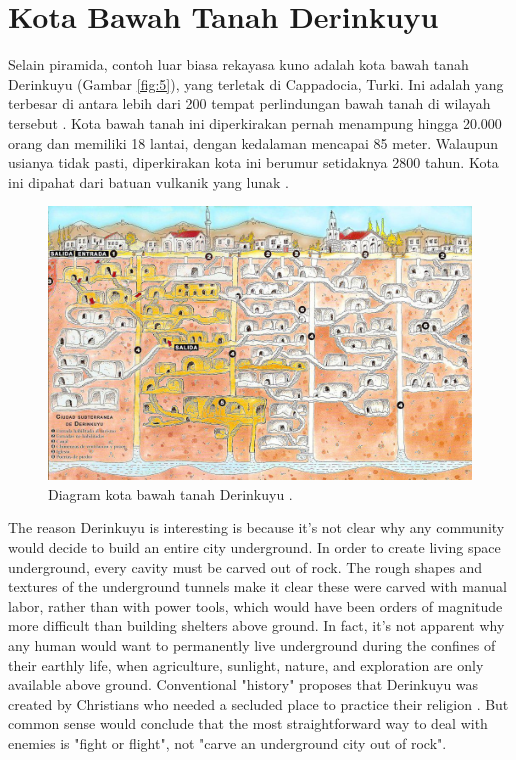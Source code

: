 \documentclass[10pt,twocolumn,letterpaper]{article}
\begin{document}
\section{Kota Bawah Tanah Derinkuyu}

Selain piramida, contoh luar biasa rekayasa kuno adalah kota bawah tanah Derinkuyu (Gambar \ref{fig:5}), yang terletak di Cappadocia, Turki. Ini adalah yang terbesar di antara lebih dari 200 tempat perlindungan bawah tanah di wilayah tersebut \cite{54}. Kota bawah tanah ini diperkirakan pernah menampung hingga 20.000 orang dan memiliki 18 lantai, dengan kedalaman mencapai 85 meter. Walaupun usianya tidak pasti, diperkirakan kota ini berumur setidaknya 2800 tahun. Kota ini dipahat dari batuan vulkanik yang lunak \cite{52, 53}.

\begin{figure}[b]
\begin{center}
   \includegraphics[width=1\linewidth]{derinkuyu.jpeg}
\end{center}
   \caption{Diagram kota bawah tanah Derinkuyu \cite{56}.}
\label{fig:5}
\label{fig:onecol}
\end{figure}
The reason Derinkuyu is interesting is because it's not clear why any community would decide to build an entire city underground. In order to create living space underground, every cavity must be carved out of rock. The rough shapes and textures of the underground tunnels make it clear these were carved with manual labor, rather than with power tools, which would have been orders of magnitude more difficult than building shelters above ground. In fact, it's not apparent why any human would want to permanently live underground during the confines of their earthly life, when agriculture, sunlight, nature, and exploration are only available above ground. Conventional "history" proposes that Derinkuyu was created by Christians who needed a secluded place to practice their religion \cite{53}. But common sense would conclude that the most straightforward way to deal with enemies is "fight or flight", not "carve an underground city out of rock".
\end{document}
